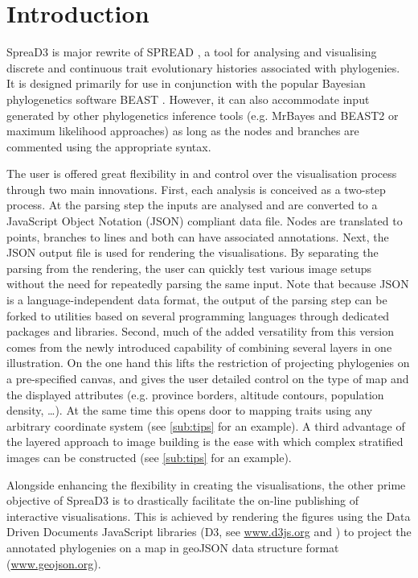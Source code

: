 \documentclass[english]{paper}
\begin{document}
\section{Introduction}
SpreaD3 is major rewrite of SPREAD \citep{bielejec11}, a tool for analysing and visualising discrete and continuous trait evolutionary histories associated with phylogenies.
It is designed primarily for use in conjunction with the popular Bayesian phylogenetics software BEAST \citep{drummond:2012zr}.
However, it can also accommodate input generated by other phylogenetics inference tools (e.g. MrBayes and BEAST2 or maximum likelihood approaches) as long as the nodes and branches are commented using the appropriate syntax.
\par
The user is offered great flexibility in and control over the visualisation process through two main innovations.
First, each analysis is conceived as a two-step process. 
At the parsing step the inputs are 
analysed and are converted to a JavaScript Object Notation (JSON) compliant data file.
Nodes are translated to points, branches to lines and both can have associated annotations. 
Next, the JSON 
output file is used for rendering the visualisations.
By separating the parsing from the rendering, the user can quickly test various image setups without the need for repeatedly parsing the same input.
Note that because JSON is a language-independent data format, the output of the parsing step can be forked to utilities based on several programming languages through dedicated packages and libraries. %
Second, much of the added versatility from this version comes from the newly introduced capability of combining several layers in one illustration. On the one hand this lifts the restriction of projecting phylogenies on a pre-specified canvas, and gives the user detailed control on the type of map and the displayed %
attributes (e.g. province borders, altitude contours, population density, \dots). %
At the same time this opens door to mapping traits using any arbitrary coordinate system (see \ref{sub:tips} for an example). 
A third advantage of the layered approach to image building is the ease with which complex stratified images can be constructed (see \ref{sub:tips} for an example). 
\par
Alongside enhancing the flexibility in creating the visualisations, the other prime objective of SpreaD3 is to drastically facilitate the on-line publishing of interactive visualisations.
This is achieved by rendering the figures using the Data Driven Documents JavaScript libraries (D3, see \url{www.d3js.org} and \citet{Bostock:2011aa}) to project the annotated phylogenies on a map in geoJSON data structure format (\url{www.geojson.org}).
\end{document}
